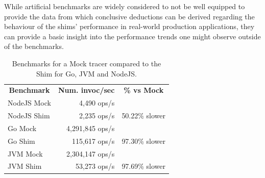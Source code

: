 \documentclass[12pt,pdftex,titlepage]{report}
\begin{document}
                While artificial benchmarks are widely considered to not be well equipped to provide the data from which conclusive deductions can be derived regarding the behaviour of the shims' performance in 
                real-world production applications, they can provide a basic insight into the performance trends one might observe outside of the benchmarks.

                \begin{table}
                    \bgroup
                    \def\arraystretch{1.2}
                        \centering
                        \begin{tabular}{|l|r|c|}
                            \toprule
                            \multicolumn{1}{c}{\textbf{Benchmark}} & \multicolumn{1}{c}{\textbf{Num. invoc/sec}} & \multicolumn{1}{c}{\textbf{\% vs Mock}}  \\ \Xhline{1.05pt}\midrule
                            NodeJS Mock                            & 4,490 ops/s                                 &                                          \\ 
                            NodeJS Shim                            & 2,235 ops/s                                 & 50.22\% slower                           \\ \midrule
                            Go Mock                                & 4,291,845 ops/s                             &                                          \\ 
                            Go Shim                                & 115,617 ops/s                               & 97.30\% slower                           \\ \midrule
                            JVM Mock                               & 2,304,147 ops/s                             &                                          \\ 
                            JVM Shim                               & 53,273 ops/s                                & 97.69\% slower                           \\ \hline
                        \end{tabular}
                        \caption{Benchmarks for a Mock tracer compared to the Shim for Go, JVM and NodeJS.}
                        \label{tab:bench}
                    \egroup
                \end{table}
\end{document}

